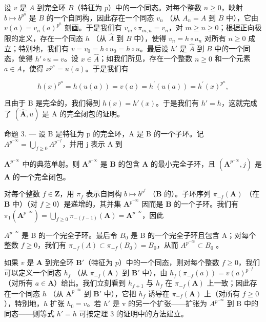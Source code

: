 设 \(v\) 是 \(A\) 到完全环 \(B\)（特征为 \(p\)）中的一个同态。对每个整数 \(n \geqslant 0\)，映射 \(b \mapsto b^{p^n}\) 是 \(B\) 的一个自同构，因此存在一个同态 \(v_n\) （从 \(A_n = A\) 到 \(B\) 中），它由 \(v(a) = v_n(a)^{p^n}\) 刻画。于是我们有 \(v_m \circ \pi_{m,n} = v_n\)，对 \(m \geqslant n \geqslant 0\)；根据正向极限的定义，存在一个同态 \(h\) （从 \(\hat{A}\) 到 \(B\) 中），使得 \(v_n = h \circ u_n\) 对所有 \(n \geqslant 0\) 成立；特别地，我们有 \(v = v_0 = h \circ u_0 = h \circ u\)。最后设 \(h'\) 是 \(\hat{A}\) 到 \(B\) 中的一个同态，使得 \(h' \circ u = v\)。设 \(x \in \hat{A}\)；如我们所见，存在一个整数 \(n \geqslant 0\) 和一个元素 \(a \in A\)，使得 \(x^{p^n} = u(a)\)。于是我们有

\[
h (x) ^ {p ^ {n}} = h (u (a)) = v (a) = h ^ {\prime} (u (a)) = h ^ {\prime} (x) ^ {p ^ {n}},
\]

且由于 B 是完全的，我们得到 \(h(x) = h'(x)\)。于是我们有 \(h' = h\)，这就完成了 \((\hat{\mathbf{A}}, u)\) 是 A 的完全闭包的证明。

命题 3. --- 设 B 是特征为 p 的完全环，A 是 B 的一个子环。记 \(A^{p^{-\infty}} = \bigcup_{f \geqslant 0} A^{p^{-f}}\)，并用 j 表示 A 到

\(\mathbf{A}^{p^{-\infty}}\) 中的典范单射。则 \(\mathbf{A}^{p^{-\infty}}\) 是 \(\mathbf{B}\) 的包含 \(\mathbf{A}\) 的最小完全子环，且 \((\mathbf{A}^{p^{-\infty}}, j)\) 是 \(\mathbf{A}\) 的一个完全闭包。

对每个整数 \(f \in \mathbf{Z}\)，用 \(\pi_f\) 表示自同构 \(b \mapsto b^{p^f}\) （\(\mathbf{B}\) 的）。子环序列 \(\pi_{-f}(\mathbf{A})\) （在 \(\mathbf{B}\) 中）（对 \(f \geqslant 0\)）是递增的，其并集 \(\mathbf{A}^{p^{-\infty}}\) 因而是 \(\mathbf{B}\) 的一个子环。我们有 \(\pi_1(\mathbf{A}^{p^{-\infty}}) = \bigcup_{f \geqslant 0} \pi_{-(f-1)}(\mathbf{A}) = \mathbf{A}^{p^{-\infty}}\)，因此

\(A^{p^{-\infty}}\) 是 B 的一个完全子环。最后令 \(B_0\) 是 B 的一个完全子环且包含 A；对每个整数 \(f \geqslant 0\)，我们有 \(\pi_{-f}(A) \subset \pi_{-f}(B_0) = B_0\)，从而 \(A^{p^{-\infty}} \subset B_0\) 。

如果 \(v\) 是 \(\mathbf{A}\) 到完全环 \(\mathbf{B}'\)（特征为 \(p\)）中的一个同态，则对每个整数 \(f \geqslant 0\)，我们可以定义一个同态 \(h_f\) （从 \(\pi_{-f}(\mathbf{A})\) 到 \(\mathbf{B}'\) 中），由 \(h_f(\pi_{-f}(a)) = v(a)^{p^{-f}}\)（对所有 \(a \in \mathbf{A}\)）给出。我们立刻看到 \(h_{f + 1}\) 与 \(h_f\) 在 \(\pi_{-f}(\mathbf{A})\) 上一致；因此存在一个同态 \(h\) （从 \(\mathbf{A}^{p^{-\infty}}\) 到 \(\mathbf{B}'\) 中），它把 \(h_f\) 诱导在 \(\pi_{-f}(\mathbf{A})\) 上（对所有 \(f \geqslant 0\)），特别地，\(h\) 扩张 \(h_0 = v\)。若 \(h'\) 是 v 的另一个扩张——扩张为 \(A^{p^{-\infty}}\) 到 B 中的同态——则等式 \(h' = h\) 可按定理 3 的证明中的方法建立。

